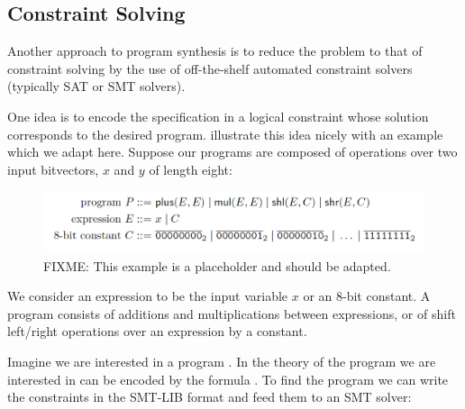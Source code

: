 \subsection{Constraint Solving}
\label{sec:constraint-solving}


Another approach to program synthesis is to reduce the problem to that of
constraint solving by the use of off-the-shelf automated constraint
solvers~\cite{Shi:2019:FCS,Feng:2018:PSU,Feng:2017:CST,Feng:2017:CSC,Solar-Lezama:2008,Jha:oracle:2010}
(typically SAT or SMT solvers).


One idea is to encode the specification in a logical constraint whose solution
corresponds to the desired program. \citeauthor{Gulwani2017} illustrate this
idea nicely with an example~\cite{Gulwani2017} which we adapt here.
Suppose our programs are composed of operations over two input bitvectors, $x$
and $y$ of length eight:

\begin{figure}[h!]
  \centering
  \includegraphics[width=\textwidth]{assets/constraint-solving-example.png}
  \caption{FIXME: This example is a placeholder and should be adapted.}
\end{figure}

We consider an expression to be the input variable $x$ or an 8-bit constant. A
program consists of additions and multiplications between expressions, or of
shift left/right operations over an expression by a constant.

Imagine we are interested in a program . In the theory of
 the program we are interested in can be encoded
by the formula . To find the program we can write the constraints in the SMT-LIB format
and feed them to an SMT solver:

